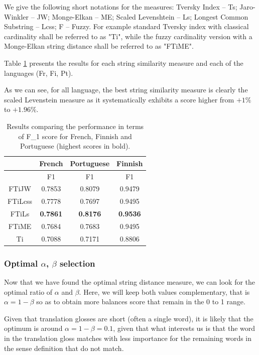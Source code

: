 \documentclass[10pt,a4paper,twoside]{article}
\begin{document}
We give the following short notations for the measures: Tversky Index -- Ts; Jaro-Winkler -- JW; Monge-Elkan -- ME; Scaled Levenshtein -- Ls; Longest Common Substring -- Lcss; F -- Fuzzy. For example standard Tversky index with classical cardinality shall be referred to as "Ti", while the fuzzy cardinality version with a Monge-Elkan string distance shall be referred to as "FTiME". 

Table \ref{tab:expe1} presents the results for each string similarity measure and each of the languages (Fr, Fi, Pt).

As we can see, for all language, the best string similarity measure is clearly the scaled Levenstein measure as it systematically exhibits a score higher from \(+1\%\) to \(+1.96\%\).

\begin{table}
{\centering \footnotesize
\begin{tabular}{|c|c|c|c|}
\hline &French&Portuguese&Finnish\\
\hline &F1&F1&F1\\
\hline FTiJW&0.7853&0.8079&0.9479\\
\hline FTiLcss&0.7778&0.7697&0.9495\\
\hline FTiLs&\textbf{0.7861}&\textbf{0.8176}&\textbf{0.9536}\\
\hline FTiME&0.7684&0.7683&0.9495\\
\hline Ti&0.7088&0.7171&0.8806\\
\hline 
\end{tabular} 
\caption{Results comparing the performance in terms of F\_1 score for French, Finnish and Portuguese (highest scores in bold).}
\label{tab:expe1}
}
\end{table}

\subsubsection{Optimal \(\alpha\), \(\beta\) selection}
Now that we have found the optimal string distance measure, we can look for the optimal ratio of \(\alpha\) and \(\beta\). Here, we will keep both values complementary, that is \(\alpha=1-\beta\) so as to obtain more balances score that remain in the 0 to 1 range. 

Given that translation glosses are short (often a single word), it is likely that the optimum is around \(\alpha=1-\beta=0.1\), given that what interests us is  that the word in the translation gloss matches with less importance for the remaining words in the sense definition that do not match.
\end{document}

